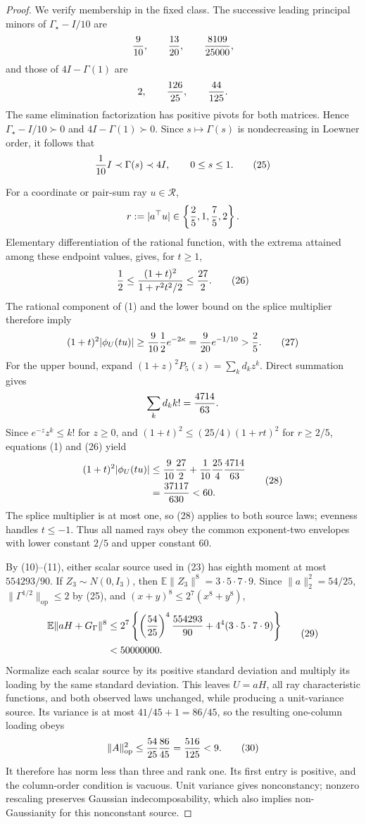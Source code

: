 \documentclass{article}
\begin{document}
\begin{proof}
We verify membership in the fixed class.  The successive leading principal minors of \(\Gamma_\star-I/10\) are
\[
 {9\over10},\qquad {13\over20},\qquad {8109\over25000},
\]
and those of \(4I-\Gamma(1)\) are
\[
 2,\qquad {126\over25},\qquad {44\over125}.
\]
The same elimination factorization has positive pivots for both matrices.  Hence \(\Gamma_\star-I/10\succ0\) and \(4I-\Gamma(1)\succ0\).  Since \(s\mapsto\Gamma(s)\) is nondecreasing in Loewner order, it follows that
\[
 {1\over10}I\prec\Gamma(s)\prec4I,
 \qquad0\le s\le1. \tag{25}
\]

For a coordinate or pair-sum ray \(u\in\mathcal R\),
\[
 r:=|a^\top u|\in\left\{{2\over5},1,{7\over5},2\right\}.
\]
Elementary differentiation of the rational function, with the extrema attained among these endpoint values, gives, for \(t\ge1\),
\[
 {1\over2}\le{(1+t)^2\over1+r^2t^2/2}\le{27\over2}. \tag{26}
\]
The rational component of (1) and the lower bound on the splice multiplier therefore imply
\[
 (1+t)^2|\phi_U(tu)|
 \ge{9\over10}{1\over2}e^{-2\kappa}
 ={9\over20}e^{-1/10}>{2\over5}. \tag{27}
\]
For the upper bound, expand \((1+z)^2P_5(z)=\sum_kd_kz^k\).  Direct summation gives
\[
 \sum_kd_kk!={4714\over63}.
\]
Since \(e^{-z}z^k\le k!\) for \(z\ge0\), and \((1+t)^2\le(25/4)(1+rt)^2\) for \(r\ge2/5\), equations (1) and (26) yield
\[
 \begin{aligned}
 (1+t)^2|\phi_U(tu)|
 &\le {9\over10}{27\over2}
 +{1\over10}{25\over4}{4714\over63}\\
 &={37117\over630}<60.
 \end{aligned} \tag{28}
\]
The splice multiplier is at most one, so (28) applies to both source laws; evenness handles \(t\le-1\).  Thus all named rays obey the common exponent-two envelopes with lower constant \(2/5\) and upper constant \(60\).

By (10)--(11), either scalar source used in (23) has eighth moment at most \(554293/90\).  If \(Z_3\sim N(0,I_3)\), then \(\mathbb E\|Z_3\|^8=3\cdot5\cdot7\cdot9\).  Since \(\|a\|_2^2=54/25\), \(\|\Gamma^{1/2}\|_{\mathrm{op}}\le2\) by (25), and \((x+y)^8\le2^7(x^8+y^8)\),
\[
 \begin{aligned}
 \mathbb E\|aH+G_\Gamma\|^8
 &\le2^7\left\{
 \left({54\over25}\right)^4{554293\over90}
 +4^4(3\cdot5\cdot7\cdot9)\right\}\\
 &<50000000. 
 \end{aligned} \tag{29}
\]
Normalize each scalar source by its positive standard deviation and multiply its loading by the same standard deviation.  This leaves \(U=aH\), all ray characteristic functions, and both observed laws unchanged, while producing a unit-variance source.  Its variance is at most \(41/45+1=86/45\), so the resulting one-column loading obeys
\[
 \|A\|_{\mathrm{op}}^2
 \le{54\over25}{86\over45}={516\over125}<9. \tag{30}
\]
It therefore has norm less than three and rank one.  Its first entry is positive, and the column-order condition is vacuous.  Unit variance gives nonconstancy; nonzero rescaling preserves Gaussian indecomposability, which also implies non-Gaussianity for this nonconstant source.


\end{proof}
\end{document}
